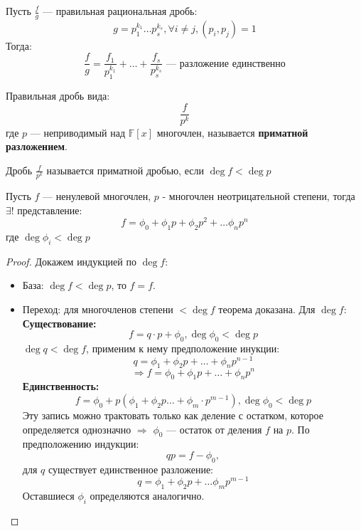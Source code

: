 \begin{consequence}
  \label{consequence:03_1}
  Пусть $\frac{f}{g}$ --- правильная рациональная дробь:
  \[
  g = p_1^{k_1} \ldots p_s^{k_s}, \forall i \neq j, (p_i, p_j) = 1
  \]
  Тогда:
  \[
  \frac{f}{g} = \frac{f_1}{p_1^{k_1}} + \ldots + \frac{f_s}{p_s^{k_s}} \text{ --- разложение единственно}
  \]
\end{consequence}
\begin{definition}
Правильная дробь вида:
\[
  \frac{f}{p^{k}}
\]
где $p$ --- неприводимый над $\mathbb{F}[x]$ многочлен, называется \textbf{приматной разложением}.
\end{definition}
\begin{definition}
  Дробь $\frac{f}{p ^{k}}$ называется приматной дробью, если $\deg f < \deg p$
\end{definition}
\begin{theorem}
\label{theorem:03_2}
  Пусть $f$ --- ненулевой многочлен, $p$ - многочлен неотрицательной степени, тогда $\exists!$ представление:
  \[
  f = \phi_0 + \phi_1 p + \phi_2 p ^{2} + \ldots \phi_n p ^{n}
  \]
  где $\deg \phi_i < \deg p$
\end{theorem}
\begin{proof}
  Докажем индукцией по $\deg f$:
  \begin{itemize}
    \item База: $\deg f < \deg p$, то $f = f$.
    \item Переход: для многочленов степени $< \deg f$ теорема доказана. Для $\deg f$:
      ~\newline
      \textbf{Существование:}
      \[
      f = q \cdot p + \phi_0, \deg \phi_0 < \deg p
      \]
      $\deg q < \deg f$, применим к нему предположение инукции:
      \[
      q = \phi_1 + \phi_2 p + \ldots + \phi_n p ^{n - 1}
      \]
      \[
      \Rightarrow f = \phi_0 + \phi_1 p + \ldots + \phi_n p ^{n}
      \]
      \textbf{Единственность:}
      \[
      f = \phi_0 + p(\phi_1 + \phi_2 p \ldots + \phi_m \cdot p ^{m - 1}), \deg \phi_0 < \deg p
      \] 
      Эту запись можно трактовать только как деление с остатком, которое определяется однозначно $\Rightarrow$ $\phi_0$ --- остаток от деления $f$ на $p$. По предположению индукции:
      \[
      qp = f - \phi_0, 
      \]
      для $q$ существует единственное разложение:
      \[
      q = \phi_1 + \phi_2 p + \ldots \phi_m p ^{m - 1}
      \]
      Оставшиеся $\phi_i$ определяются аналогично.
  \end{itemize}
\end{proof}

